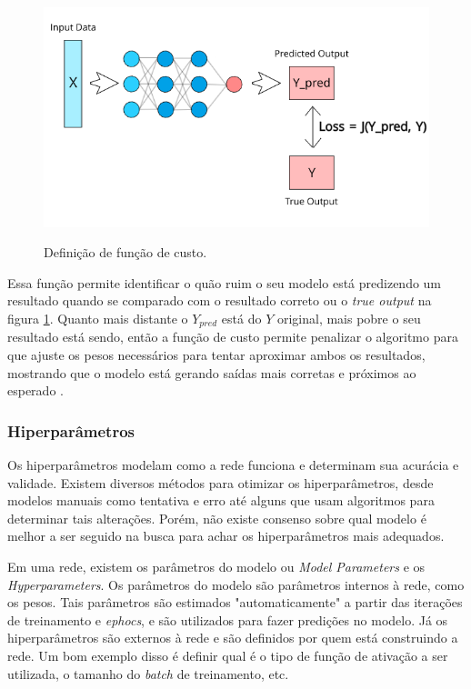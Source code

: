 
\begin{figure}[H]
  \centering
  \caption{Definição de função de custo.}
  \includegraphics[scale=0.6]{figuras/cost-function.png}
  \label{fig:cost-function}
\end{figure}

Essa função permite identificar o quão ruim o seu modelo está predizendo um resultado quando se comparado com o resultado correto ou o \textit{true output} na figura \ref{fig:cost-function}. Quanto mais distante o $Y_{pred}$ está do $Y$ original, mais pobre o seu resultado está sendo, então a função de custo permite penalizar o algoritmo para que ajuste os pesos necessários para tentar aproximar ambos os resultados, mostrando que o modelo está gerando saídas mais corretas e próximos ao esperado \cite{cost-function}.

\subsubsection{Hiperparâmetros} \label{sssec:hiperparameters}

Os hiperparâmetros modelam como a rede funciona e determinam sua acurácia e validade. Existem diversos métodos para otimizar os hiperparâmetros, desde modelos manuais como tentativa e erro até alguns que usam algoritmos para determinar tais alterações. Porém, não existe consenso sobre qual modelo é melhor a ser seguido na busca para achar os hiperparâmetros mais adequados.

Em uma rede, existem os parâmetros do modelo ou \textit{Model Parameters} e os \textit{Hyperparameters}. Os parâmetros do modelo são parâmetros internos à rede, como os pesos. Tais parâmetros são estimados "automaticamente" a partir das iterações de treinamento e \textit{ephocs}, e são utilizados para fazer predições no modelo. Já os hiperparâmetros são externos à rede e são definidos por quem está construindo a rede. Um bom exemplo disso é definir qual é o tipo de função de ativação a ser utilizada, o tamanho do \textit{batch} de treinamento, etc.

